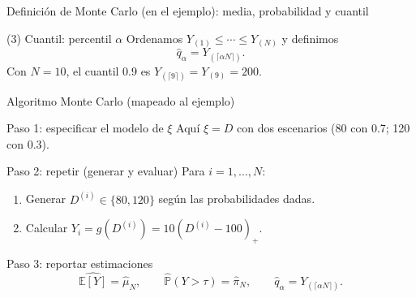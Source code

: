 \documentclass[aspectratio=1610, 9pt]{beamer}
\begin{document}
\begin{frame}{Definición de Monte Carlo (en el ejemplo): media, probabilidad y cuantil}

\begin{block}{(3) Cuantil: percentil \texorpdfstring{$\alpha$}{alpha}}
Ordenamos $Y_{(1)}\le \cdots \le Y_{(N)}$ y definimos
\[
\widehat q_\alpha = Y_{(\lceil \alpha N\rceil)}.
\]
Con $N=10$, el cuantil 0.9 es $Y_{(\lceil 9\rceil)}=Y_{(9)}=200$.
\end{block}
\end{frame}

\begin{frame}{Algoritmo Monte Carlo (mapeado al ejemplo)}
\begin{block}{Paso 1: especificar el modelo de \texorpdfstring{$\xi$}{xi}}
Aquí $\xi=D$ con dos escenarios (80 con 0.7; 120 con 0.3).
\end{block}

\begin{block}{Paso 2: repetir (generar y evaluar)}
Para $i=1,\dots,N$:
\begin{enumerate}
  \item Generar $D^{(i)}\in\{80,120\}$ según las probabilidades dadas.
  \item Calcular $Y_i=g(D^{(i)})=10(D^{(i)}-100)_+$.
\end{enumerate}
\end{block}

\begin{block}{Paso 3: reportar estimaciones}
\[
\widehat{\mathbb E[Y]}=\widehat\mu_N,\qquad
\widehat{\mathbb P}(Y>\tau)=\widehat\pi_N,\qquad
\widehat q_\alpha=Y_{(\lceil \alpha N\rceil)}.
\]
\end{block}

\end{frame}
\end{document}
